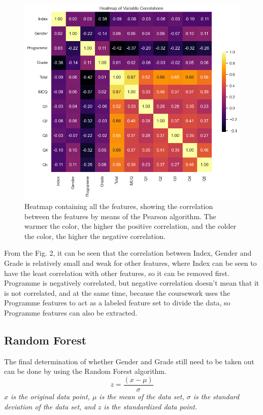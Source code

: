 \documentclass[twocolumn]{IEEEtran}
\begin{document}
\begin{figure}[H]
    \centering %
    \includegraphics[scale=0.35]{./img/heatmap.png}
    \caption{Heatmap containing all the features, showing the correlation between the features by means of the Pearson algorithm. The warmer the color, the higher the positive correlation, and the colder the color, the higher the negative correlation.}
\end{figure}
\vspace{-0.2cm}
From the Fig. 2, it can be seen  that the correlation between Index, Gender and Grade is relatively small and weak for other features, where Index can be seen to have the least correlation with other features, so it can be removed first. Programme is negatively correlated, but negative correlation doesn't mean that it is not correlated, and at the same time, because the coursework uses the Programme features to act as a labeled feature set to divide the data, so Programme features can also be extracted.

\subsection{Random Forest}
The final determination of whether Gender and Grade still need to be taken out can be done by using the Random Forest algorithm. 
\begin{equation}
    z = \frac{(x - \mu)}{\sigma}
\end{equation}
\textit{\(x\) is the original data point, \(\mu\) is the mean of the data set, \(\sigma\) is the standard deviation of the data set, and \(z\) is the standardized data point.} 
\end{document}
